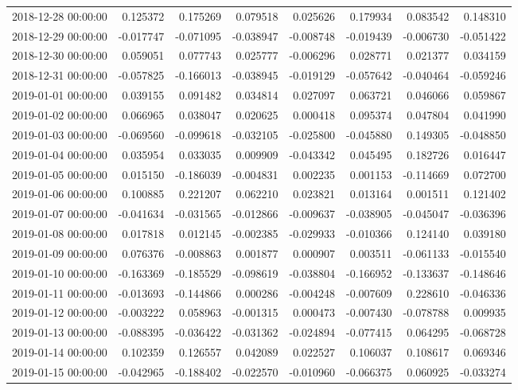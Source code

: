 \begin{tabular}{lrrrrrrr}
2018-12-28 00:00:00 & 0.125372 & 0.175269 & 0.079518 & 0.025626 & 0.179934 & 0.083542 & 0.148310 \\
2018-12-29 00:00:00 & -0.017747 & -0.071095 & -0.038947 & -0.008748 & -0.019439 & -0.006730 & -0.051422 \\
2018-12-30 00:00:00 & 0.059051 & 0.077743 & 0.025777 & -0.006296 & 0.028771 & 0.021377 & 0.034159 \\
2018-12-31 00:00:00 & -0.057825 & -0.166013 & -0.038945 & -0.019129 & -0.057642 & -0.040464 & -0.059246 \\
2019-01-01 00:00:00 & 0.039155 & 0.091482 & 0.034814 & 0.027097 & 0.063721 & 0.046066 & 0.059867 \\
2019-01-02 00:00:00 & 0.066965 & 0.038047 & 0.020625 & 0.000418 & 0.095374 & 0.047804 & 0.041990 \\
2019-01-03 00:00:00 & -0.069560 & -0.099618 & -0.032105 & -0.025800 & -0.045880 & 0.149305 & -0.048850 \\
2019-01-04 00:00:00 & 0.035954 & 0.033035 & 0.009909 & -0.043342 & 0.045495 & 0.182726 & 0.016447 \\
2019-01-05 00:00:00 & 0.015150 & -0.186039 & -0.004831 & 0.002235 & 0.001153 & -0.114669 & 0.072700 \\
2019-01-06 00:00:00 & 0.100885 & 0.221207 & 0.062210 & 0.023821 & 0.013164 & 0.001511 & 0.121402 \\
2019-01-07 00:00:00 & -0.041634 & -0.031565 & -0.012866 & -0.009637 & -0.038905 & -0.045047 & -0.036396 \\
2019-01-08 00:00:00 & 0.017818 & 0.012145 & -0.002385 & -0.029933 & -0.010366 & 0.124140 & 0.039180 \\
2019-01-09 00:00:00 & 0.076376 & -0.008863 & 0.001877 & 0.000907 & 0.003511 & -0.061133 & -0.015540 \\
2019-01-10 00:00:00 & -0.163369 & -0.185529 & -0.098619 & -0.038804 & -0.166952 & -0.133637 & -0.148646 \\
2019-01-11 00:00:00 & -0.013693 & -0.144866 & 0.000286 & -0.004248 & -0.007609 & 0.228610 & -0.046336 \\
2019-01-12 00:00:00 & -0.003222 & 0.058963 & -0.001315 & 0.000473 & -0.007430 & -0.078788 & 0.009935 \\
2019-01-13 00:00:00 & -0.088395 & -0.036422 & -0.031362 & -0.024894 & -0.077415 & 0.064295 & -0.068728 \\
2019-01-14 00:00:00 & 0.102359 & 0.126557 & 0.042089 & 0.022527 & 0.106037 & 0.108617 & 0.069346 \\
2019-01-15 00:00:00 & -0.042965 & -0.188402 & -0.022570 & -0.010960 & -0.066375 & 0.060925 & -0.033274 \\

\end{tabular}

